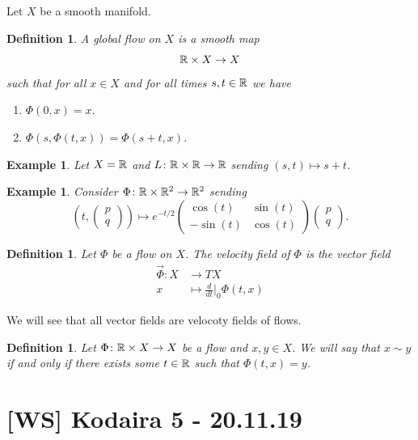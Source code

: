 \documentclass[A4paper, british]{amsart}
\theoremstyle{darkgreentheorem}
\theoremstyle{darkbluedefinition}
\newtheorem{defn}[thm]{Definition}
\theoremstyle{darkredexample}
\newtheorem{exa}[thm]{Example}
\theoremstyle{remark}
\newcommand{\1}{\mathbbm{1}}
\newcommand{\tms}{\times}
\begin{document}
Let $X$ be a smooth manifold.

\begin{defn}
    A \textit{global flow} on $X$ is a smooth map 
    \[ \R\tms X\to X \]
    such that for all $x\in X$ and for all times $s,t\in \mathbb{R}$ we have
    \begin{enumerate}[label=\roman*)]
	\item $\Phi(0,x)=x$.
	\item $\Phi(s,\Phi(t,x))=\Phi(s+t,x)$.
    \end{enumerate}
\end{defn}

\begin{exa}
    Let $X=\mathbb{R}$ and $L\colon \R\tms \R\to \R$ sending $(s,t)\mapsto s+t$.
\end{exa}

\begin{exa}
    Consider $\Phi\colon \R\tms \R^{2}\to \R^{2}$ sending
    \[ \left(t,\begin{pmatrix} p \\ q \end{pmatrix}\right)\mapsto e^{-t/2}\begin{pmatrix} \cos(t) & \sin(t) \\ -\sin(t) & \cos(t) \end{pmatrix} \begin{pmatrix} p \\ q \end{pmatrix}. \]
\end{exa}

\begin{defn}
    Let $\Phi$ be a flow on $X$.
    The \textit{velocity field} of $\Phi$ is the vector field
    \begin{align*}
	\vec{\Phi}\colon X&\longrightarrow TX \\
	x&\longmapsto \frac{d}{dt}|_{0}\Phi(t,x)
    \end{align*}
\end{defn}

We will see that all vector fields are velocoty fields of flows.

\begin{defn}
    Let $\Phi\colon \R\tms X\to X$ be a flow and $x,y\in X$.
    We will say that $x\sim y$ if and only if there exists some $t\in \mathbb{R}$ such that $\Phi(t,x)=y$.
\end{defn}

\section{[WS] Kodaira 5 - 20.11.19}
\end{document}
